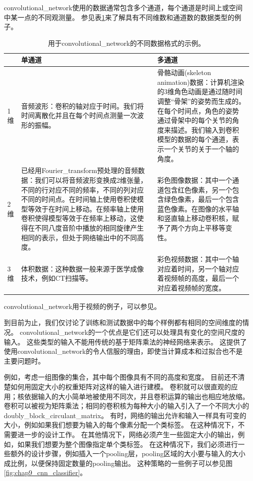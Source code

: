 \gls{convolutional_network}使用的数据通常包含多个通道，每个通道是时间上或空间中某一点的不同观测量。
参见表\ref{table:data_types}来了解具有不同维数和通道数的数据类型的例子。
 
\begin{table}[htbp!]
\centering
 \begin{tabular}[t]{l|p{}|p{}}
& 单通道 & 多通道\\ \hline
1维 & 
音频波形：卷积的轴对应于时间。我们将时间离散化并且在每个时间点测量一次波形的振幅。 &  
骨骼动画(skeleton animation)数据：计算机渲染的3维角色动画是通过随时间调整``骨架''的姿势而生成的。 在每个时间点，角色的姿势通过骨架中的每个关节的角度来描述。我们输入到卷积模型的数据的每个通道，表示一个关节的关于一个轴的角度。\\ \hline
2维 & 
已经用\gls{Fourier_transform}预处理的音频数据：我们可以将音频波形变换成2维张量，不同的行对应不同的频率，不同的列对应不同的时间点。在时间轴上使用卷积使模型等效于在时间上移动。在频率轴上使用卷积使得模型等效于在频率上移动，这使得在不同八度音阶中播放的相同旋律产生相同的表示，但处于网络输出中的不同高度。 & %
彩色图像数据：其中一个通道包含红色像素，另一个包含绿色像素，最后一个包含蓝色像素。在图像的水平轴和竖直轴上移动卷积核，赋予了两个方向上平移等变性。\\ \hline
3维 &
体积数据：这种数据一般来源于医学成像技术，例如CT扫描等。 & 
彩色视频数据：其中一个轴对应着时间，另一个轴对应着视频帧的高度，最后一个对应着视频帧的宽度。\\
\end{tabular}
\label{table:data_types}
\caption{用于\gls{convolutional_network}的不同数据格式的示例。}
\end{table}
 
\gls{convolutional_network}用于视频的例子，可以参见\cite{Chen-Ting-2010}。

到目前为止，我们仅讨论了训练和测试数据中的每个样例都有相同的空间维度的情况。
\gls{convolutional_network}的一个优点是它们还可以处理具有变化的空间尺度的输入。
这些类型的输入不能用传统的基于矩阵乘法的神经网络来表示。
这提供了使用\gls{convolutional_network}的令人信服的理由，即使当计算成本和过拟合也不是主要问题时。

例如，考虑一组图像的集合，其中每个图像具有不同的高度和宽度。
目前还不清楚如何用固定大小的权重矩阵对这样的输入进行建模。
卷积就可以很直观的应用；核依据输入的大小简单地被使用不同次，并且卷积运算的输出也相应地放缩。
卷积可以被视为矩阵乘法；相同的卷积核为每种大小的输入引入了一个不同大小的\gls{doubly_block_circulant_matrix}。
有时，网络的输出允许和输入一样具有可变的大小，例如如果我们想要为输入的每个像素分配一个类标签。
在这种情况下，不需要进一步的设计工作。
在其他情况下，网络必须产生一些固定大小的输出，例如，如果我们想要为整个图像指定单个类标签。
在这种情况下，我们必须进行一些额外的设计步骤，例如插入一个\gls{pooling}层，\gls{pooling}区域的大小要与输入的大小成比例，以便保持固定数量的\gls{pooling}输出。
这种策略的一些例子可以参见图\ref{fig:chap9_cnn_classifier}。

